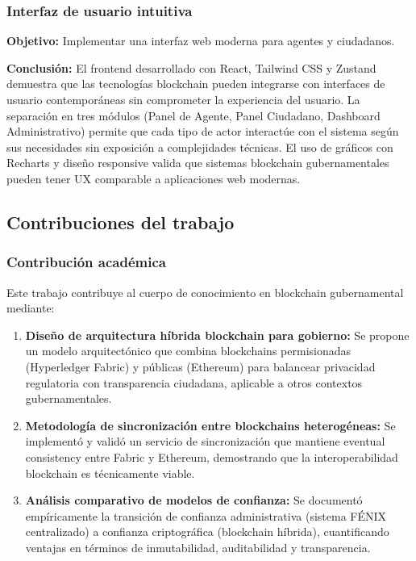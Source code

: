 \subsubsection{Interfaz de usuario intuitiva}

\textbf{Objetivo:} Implementar una interfaz web moderna para agentes y ciudadanos.

\textbf{Conclusión:} El frontend desarrollado con React, Tailwind CSS y Zustand demuestra que las tecnologías blockchain pueden integrarse con interfaces de usuario contemporáneas sin comprometer la experiencia del usuario. La separación en tres módulos (Panel de Agente, Panel Ciudadano, Dashboard Administrativo) permite que cada tipo de actor interactúe con el sistema según sus necesidades sin exposición a complejidades técnicas. El uso de gráficos con Recharts y diseño responsive valida que sistemas blockchain gubernamentales pueden tener UX comparable a aplicaciones web modernas.

\subsection{Contribuciones del trabajo}

\subsubsection{Contribución académica}

Este trabajo contribuye al cuerpo de conocimiento en blockchain gubernamental mediante:

\begin{enumerate}
    \item \textbf{Diseño de arquitectura híbrida blockchain para gobierno:} Se propone un modelo arquitectónico que combina blockchains permisionadas (Hyperledger Fabric) y públicas (Ethereum) para balancear privacidad regulatoria con transparencia ciudadana, aplicable a otros contextos gubernamentales.
    
    \item \textbf{Metodología de sincronización entre blockchains heterogéneas:} Se implementó y validó un servicio de sincronización que mantiene eventual consistency entre Fabric y Ethereum, demostrando que la interoperabilidad blockchain es técnicamente viable.
    
    \item \textbf{Análisis comparativo de modelos de confianza:} Se documentó empíricamente la transición de confianza administrativa (sistema FÉNIX centralizado) a confianza criptográfica (blockchain híbrida), cuantificando ventajas en términos de inmutabilidad, auditabilidad y transparencia.
\end{enumerate}

